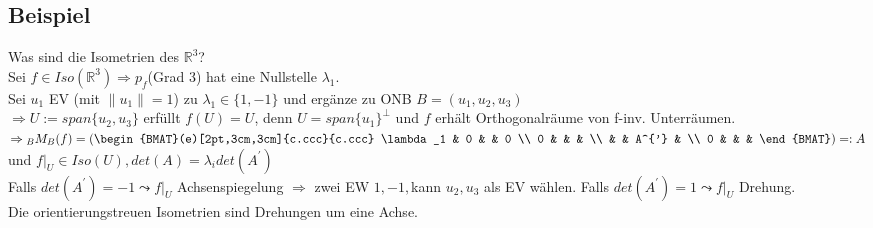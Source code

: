 \documentclass[a4paper, 12pt]{extarticle}
\newcommand{\norm}[1]{
	\parallel #1 \parallel
}
\begin{document}
\subsection*{Beispiel}
Was sind die Isometrien des $\mathbb{R}^3$?\\
Sei $f\in Iso(\mathbb{R}^3) \Rightarrow p_f$(Grad 3) hat eine Nullstelle $\lambda_1$.\\
Sei $u_1$ EV (mit $\norm{u_1} = 1$) zu $\lambda_1 \in  \{1, -1\}$ und ergänze zu ONB $B = (u_1, u_2, u_3)$\\
$\Rightarrow U:= span\{u_2,u_3\}$ erfüllt $f(U) = U$, denn $U = span\{u_1\}^{\perp}$ und $f$ erhält Orthogonalräume von f-inv. Unterräumen.\\
$\Rightarrow {}_BM_B(f) = \left(\begin{BMAT}(e)[2pt,3cm,3cm]{c.ccc}{c.ccc}
	\lambda_1 & 0 & & 0 \\
	0 & & & \\
	& & A^{'} & \\
	0 & & & 
\end{BMAT}\right) =: A$ und $f|_U \in Iso(U), det(A) = \lambda_i det(A^{'})$\\
Falls $det(A^{'}) = -1 \leadsto f|_U$ Achsenspiegelung $\Rightarrow$ zwei EW $1, -1,$kann $u_2, u_3$ als EV wählen.
Falls $det(A^{'}) = 1 \leadsto f|_U$ Drehung.\\
Die orientierungstreuen Isometrien sind Drehungen um eine Achse.
\end{document}

